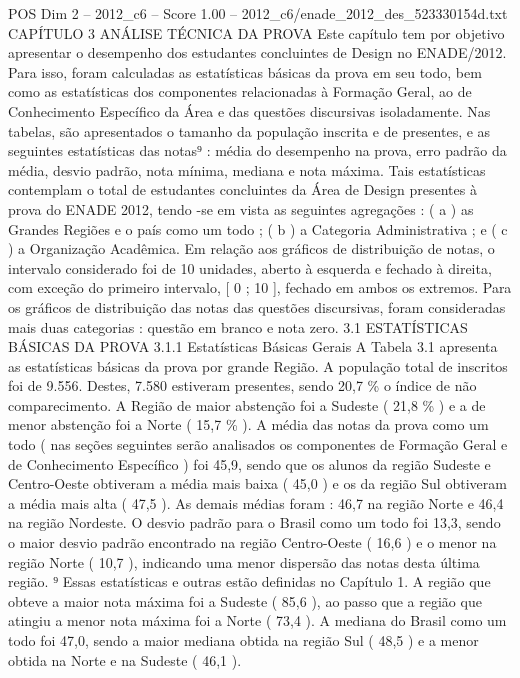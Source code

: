 \begin{textsample}{POS Dim 2 – 2012\_c6 – Score 1.00 – 2012\_c6/enade\_2012\_des\_523330154d.txt}  \label{ex:f2_pos_245}
CAPÍTULO 3 ANÁLISE TÉCNICA DA PROVA Este capítulo tem por objetivo apresentar o desempenho dos estudantes concluintes de Design no ENADE/2012.
Para isso, foram calculadas as estatísticas básicas da prova em seu todo, bem como as estatísticas dos componentes relacionadas à Formação Geral, ao de Conhecimento Específico da Área e das questões discursivas isoladamente.
Nas tabelas, são apresentados o tamanho da população inscrita e de presentes, e as seguintes estatísticas das notas⁹ : média do desempenho na prova, erro padrão da média, desvio padrão, nota mínima, mediana e nota máxima.
Tais estatísticas contemplam o total de estudantes concluintes da Área de Design presentes à prova do ENADE 2012, tendo -se em vista as seguintes agregações : ( a ) as Grandes Regiões e o país como um todo ; ( b ) a Categoria Administrativa ; e ( c ) a Organização Acadêmica.
Em relação aos gráficos de distribuição de notas, o intervalo considerado foi de 10 unidades, aberto à esquerda e fechado à direita, com exceção do primeiro intervalo, [ 0 ; 10 ], fechado em ambos os extremos.
Para os gráficos de distribuição das notas das questões discursivas, foram consideradas mais duas categorias : questão em branco e nota zero. 3.1 ESTATÍSTICAS BÁSICAS DA PROVA 3.1.1 Estatísticas Básicas Gerais A Tabela 3.1 apresenta as estatísticas básicas da prova por grande Região.
A população total de inscritos foi de 9.556.
Destes, 7.580 estiveram presentes, sendo 20,7 \% o índice de não comparecimento.
A Região de maior abstenção foi a Sudeste ( 21,8 \% ) e a de menor abstenção foi a Norte ( 15,7 \% ).
A média das notas da prova como um todo ( nas seções seguintes serão analisados os componentes de Formação Geral e de Conhecimento Específico ) foi 45,9, sendo que os alunos da região Sudeste e Centro-Oeste obtiveram a média mais baixa ( 45,0 ) e os da região Sul obtiveram a média mais alta ( 47,5 ).
As demais médias foram : 46,7 na região Norte e 46,4 na região Nordeste.
O desvio padrão para o Brasil como um todo foi 13,3, sendo o maior desvio padrão encontrado na região Centro-Oeste ( 16,6 ) e o menor na região Norte ( 10,7 ), indicando uma menor dispersão das notas desta última região. ⁹ Essas estatísticas e outras estão definidas no Capítulo 1.
A região que obteve a maior nota máxima foi a Sudeste ( 85,6 ), ao passo que a região que atingiu a menor nota máxima foi a Norte ( 73,4 ).
A mediana do Brasil como um todo foi 47,0, sendo a maior mediana obtida na região Sul ( 48,5 ) e a menor obtida na Norte e na Sudeste ( 46,1 ).

\end{textsample}
